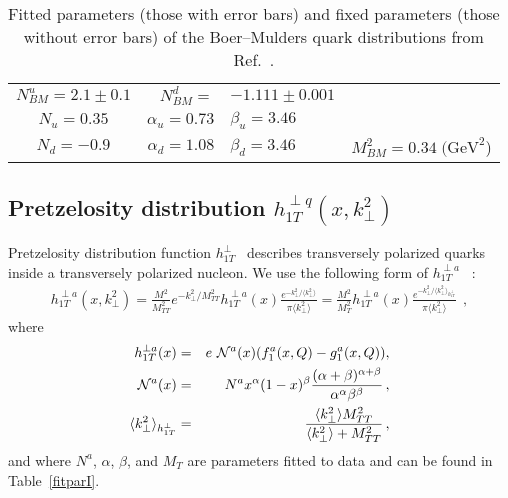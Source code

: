 \documentclass[a4paper,11pt]{article}
\newcommand{\ba}{\begin{eqnarray}}
\newcommand{\ea}{\end{eqnarray}}
\newcommand{\la}{\langle}
\newcommand{\ra}{\rangle}
\def\kperp{k_\perp}
\def\avkperp{\la \kperp^2 \ra}
\begin{document}
\begin{table}
\centering
\begin{tabular}{crll}
\hline
$N_{BM}^u=2.1\pm0.1$ & $N_{BM}^d=$&$-1.111\pm0.001$   \\
$N_u=0.35$ & $\alpha_u=0.73$ & $\beta_u=3.46$ \\
$N_d=-0.9$ & $\alpha_d=1.08$ & $\beta_d=3.46$
& $M_{BM}^2=0.34\; \textrm{(GeV}^2$)    \\
\hline
\end{tabular}
\caption{Fitted parameters (those with error bars)
and fixed parameters (those without error bars)
of the Boer--Mulders quark distributions from Ref.~\cite{Barone:2009hw}.}
\label{fitparbm}
\end{table}
%

\subsection{\boldmath Pretzelosity distribution $h_{1T}^{\perp q}(x,k_\perp^{2})$}
\label{App:basis-h1Tperp}

Pretzelosity distribution function
$h_{1T}^{\perp}$~\cite{Lefky:2014eia} describes transversely polarized quarks
inside a transversely polarized nucleon.
We use the following form of $h_{1T}^{\perp a}$ ~\cite{Lefky:2014eia}:
\ba
h_{1T}^{\perp a}(x,k_{\perp}^2) = \frac{M^2}{M_{TT}^2} e^{-\kperp^2/M_{TT}^2} h^{\perp a}_{1T}(x) \frac{e^{-{\kperp^2}/{\avkperp}}}{\pi \avkperp}=\frac{M^2}{M_T^2} h^{\perp a}_{1T}(x) \frac{e^{-{\kperp^2}/{\avkperp_{h_{1T}^\perp}}}}{\pi \avkperp}\,\;,
\label{eq:h1Tperp}
\ea
where
\ba
h^{\perp a}_{1T}(x) &=& e  \ {\cal N}^a(x) (f_{1}^{a}(x, Q) - g_{1}^{a}(x, Q)), \label{eq:hx_par}\\
{\cal N}^a(x) &=& N^{a} x^{\alpha} (1-x)^{\beta} \frac{(\alpha + \beta)^{\alpha + \beta}}{\alpha^{\alpha} \beta^{\beta}}\, ,  \\
\avkperp_{h_{1T}^\perp}  &=& \frac{\avkperp M_{TT}^2}{\avkperp + M_{TT}^2}\, ,
\ea
and where ${N}^a$, $\alpha$, $\beta$, and $M_T$ are parameters fitted to data and can be found in Table~\ref{fitparI}.
\end{document}
